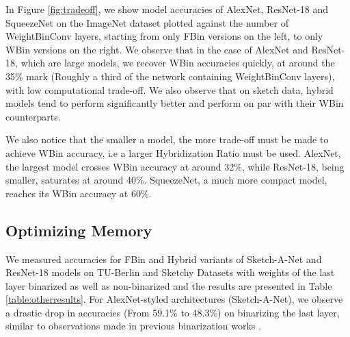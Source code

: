 \documentclass[10pt,twocolumn,letterpaper]{article}
\begin{document}
In Figure \ref{fig:tradeoff}, we show model accuracies of AlexNet, ResNet-18 and SqueezeNet on the ImageNet dataset plotted against the number of WeightBinConv layers, starting from only FBin versions on the left, to only WBin versions on the right. We observe that in the case of AlexNet and ResNet-18, which are large models, we recover WBin accuracies quickly, at around the 35\% mark (Roughly a third of the network containing WeightBinConv layers), with low computational trade-off. We also observe that on sketch data, hybrid models tend to perform significantly better and perform on par with their WBin counterparts. 

We also notice that the smaller a model, the more trade-off must be made to achieve WBin accuracy, i.e a larger Hybridization Ratio must be used. AlexNet, the largest model crosses WBin accuracy at around 32\%, while ResNet-18, being smaller, saturates at around 40\%. SqueezeNet, a much more compact model, reaches its WBin accuracy at 60\%.

\subsection{Optimizing Memory}
We measured accuracies for FBin and Hybrid variants of Sketch-A-Net and ResNet-18 models on TU-Berlin and Sketchy Datasets with weights of the last layer binarized as well as non-binarized and the results are presented in Table \ref{table:otherresults}. For AlexNet-styled architectures (Sketch-A-Net), we observe a drastic drop in accuracies (From 59.1\% to 48.3\%) on binarizing the last layer, similar to observations made in previous binarization works \cite{zhou2016dorefa,tang2017train}. 
\end{document}

